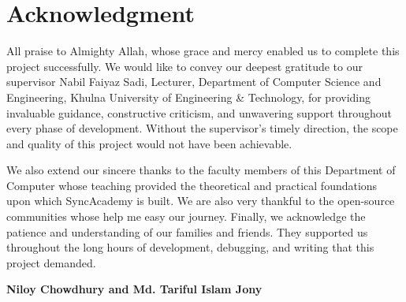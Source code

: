 \documentclass[12pt,a4paper]{report}
\begin{document}
\chapter*{Acknowledgment}
\thispagestyle{plain}
\vspace{2\baselineskip}

All praise to Almighty Allah, whose grace and mercy enabled us to complete this project successfully. We would like to convey our deepest gratitude to our supervisor Nabil Faiyaz Sadi, Lecturer, Department of Computer Science and Engineering, Khulna University
of Engineering \& Technology, for providing invaluable guidance, constructive criticism, and unwavering support throughout every phase of development. Without the supervisor's timely direction, the scope and quality of this project would not have been achievable.

We also extend our sincere thanks to the faculty members of this Department of Computer whose teaching provided the theoretical and practical foundations upon which SyncAcademy is built. We are also very thankful to the open-source communities whose help me easy our journey.
Finally, we acknowledge the patience and understanding of our families and friends. They supported us throughout the long hours of development, debugging, and writing that this project demanded.

\vspace{2\baselineskip}
\hfill{\fontsize{12}{18}\selectfont\bfseries Niloy Chowdhury and Md. Tariful Islam Jony}
\newpage

\end{document}
